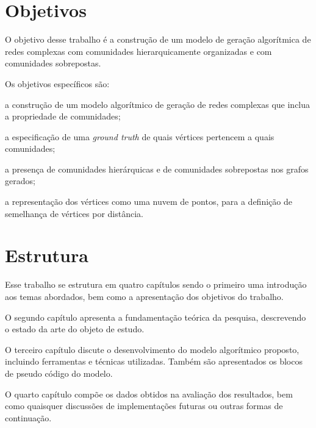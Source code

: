 \documentclass[notes.tex]{subfiles}
\begin{document}
\section{Objetivos}

O objetivo desse trabalho é a construção de um modelo de geração algorítmica de redes complexas com comunidades hierarquicamente organizadas e com comunidades sobrepostas.

Os objetivos específicos são:

\begin{alineas}
    \item a construção de um modelo algorítmico de geração de redes complexas que inclua a propriedade de comunidades;
    \item a especificação de uma \emph{ground truth} de quais vértices pertencem a quais comunidades;
    \item a presença de comunidades hierárquicas e de comunidades sobrepostas nos grafos gerados;
    \item a representação dos vértices como uma nuvem de pontos, para a definição de semelhança de vértices por distância.
\end{alineas}

\section{Estrutura}

Esse trabalho se estrutura em quatro capítulos sendo o primeiro uma introdução aos temas abordados, bem como a apresentação dos objetivos do trabalho.

O segundo capítulo apresenta a fundamentação teórica da pesquisa, descrevendo o estado da arte do objeto de estudo.

O terceiro capítulo discute o desenvolvimento do modelo algorítmico proposto, incluindo ferramentas e técnicas utilizadas.
Também são apresentados os blocos de pseudo código do modelo.

O quarto capítulo compõe os dados obtidos na avaliação dos resultados, bem como quaisquer discussões de implementações futuras ou outras formas de continuação.
\end{document}
